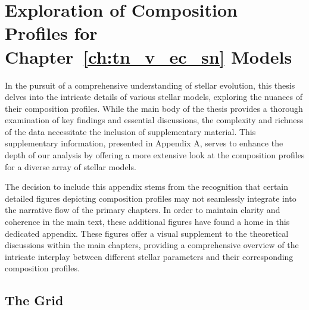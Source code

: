 \documentclass[main.tex]{subfiles}
\begin{document}
\chapter{Exploration of Composition Profiles for Chapter~\ref{ch:tn_v_ec_sn} Models}\label{apx:composition}
In the pursuit of a comprehensive understanding of stellar evolution, this thesis delves into the intricate details of various stellar models, exploring the nuances of their composition profiles. While the main body of the thesis provides a thorough examination of key findings and essential discussions, the complexity and richness of the data necessitate the inclusion of supplementary material. This supplementary information, presented in Appendix A, serves to enhance the depth of our analysis by offering a more extensive look at the composition profiles for a diverse array of stellar models.

The decision to include this appendix stems from the recognition that certain detailed figures depicting composition profiles may not seamlessly integrate into the narrative flow of the primary chapters. In order to maintain clarity and coherence in the main text, these additional figures have found a home in this dedicated appendix. These figures offer a visual supplement to the theoretical discussions within the main chapters, providing a comprehensive overview of the intricate interplay between different stellar parameters and their corresponding composition profiles.

\section{The \seriesone Grid}
\end{document}
